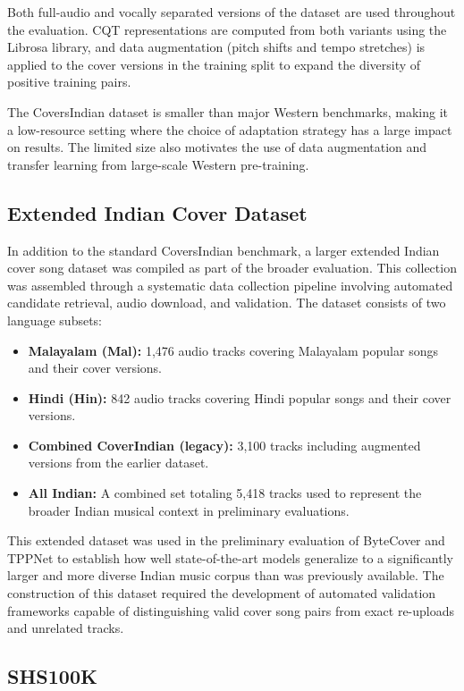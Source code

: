 \documentclass[conference]{IEEEtran}
\begin{document}
Both full-audio and vocally separated versions of the dataset are used throughout the evaluation. CQT representations are computed from both variants using the Librosa library, and data augmentation (pitch shifts and tempo stretches) is applied to the cover versions in the training split to expand the diversity of positive training pairs.

The CoversIndian dataset is smaller than major Western benchmarks, making it a low-resource setting where the choice of adaptation strategy has a large impact on results. The limited size also motivates the use of data augmentation and transfer learning from large-scale Western pre-training.

\subsection{Extended Indian Cover Dataset}

In addition to the standard CoversIndian benchmark, a larger extended Indian cover song dataset was compiled as part of the broader evaluation. This collection was assembled through a systematic data collection pipeline involving automated candidate retrieval, audio download, and validation. The dataset consists of two language subsets:

\begin{itemize}
    \item \textbf{Malayalam (Mal):} 1,476 audio tracks covering Malayalam popular songs and their cover versions.
    \item \textbf{Hindi (Hin):} 842 audio tracks covering Hindi popular songs and their cover versions.
    \item \textbf{Combined CoverIndian (legacy):} 3,100 tracks including augmented versions from the earlier dataset.
    \item \textbf{All Indian:} A combined set totaling 5,418 tracks used to represent the broader Indian musical context in preliminary evaluations.
\end{itemize}

This extended dataset was used in the preliminary evaluation of ByteCover and TPPNet to establish how well state-of-the-art models generalize to a significantly larger and more diverse Indian music corpus than was previously available. The construction of this dataset required the development of automated validation frameworks capable of distinguishing valid cover song pairs from exact re-uploads and unrelated tracks.

\subsection{SHS100K}
\end{document}
